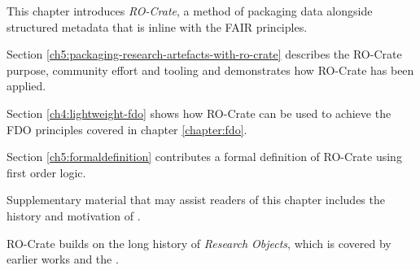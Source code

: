 This chapter introduces \emph{RO-Crate}, a method of packaging data alongside structured metadata that is inline with the FAIR principles. 

Section \vref{ch5:packaging-research-artefacts-with-ro-crate} describes the RO-Crate purpose,  community effort and tooling and demonstrates how RO-Crate has been applied.

Section \vref{ch4:lightweight-fdo} shows how RO-Crate can be used to achieve the FDO principles covered in chapter \ref{chapter:fdo}.

Section \vref{ch5:formaldefinition} contributes a formal definition of RO-Crate using first order logic.

Supplementary material that may assist readers of this chapter includes the history and motivation of   \cite{10.5281/zenodo.3337883}. 

RO-Crate builds on the long history of \emph{Research Objects}, which is covered by earlier works  \cite{Bechhofer 2013,Belhajjame 2015,goble-ro2018} and the .
